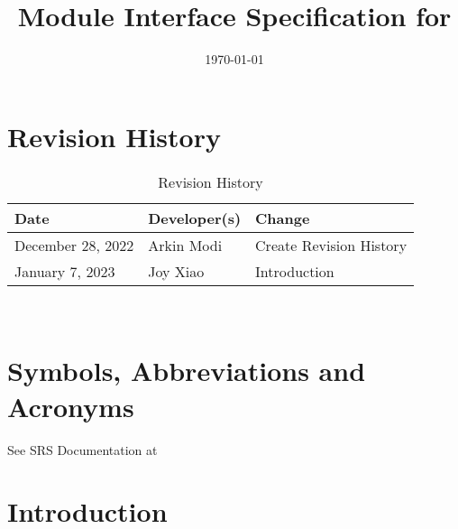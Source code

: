 \documentclass[12pt, titlepage]{article}
\begin{document}
\title{Module Interface Specification for \progname{}}

\author{\authname}

\date{\today}

\maketitle


\section{Revision History}

\begin{table}[hp]
	\caption{Revision History} \label{TblRevisionHistory}
	\begin{tabularx}{\textwidth}{llX}
		\toprule
		\textbf{Date}     & \textbf{Developer(s)} & \textbf{Change}         \\
		\midrule
		December 28, 2022 & Arkin Modi            & Create Revision History \\
		January 7, 2023   & Joy Xiao              & Introduction            \\
		\bottomrule
	\end{tabularx}
\end{table}

~\newpage

\section{Symbols, Abbreviations and Acronyms}

See SRS Documentation at 


\newpage

\tableofcontents

\newpage

\listoftables

\listoffigures

\newpage


\section{Introduction}
\end{document}
